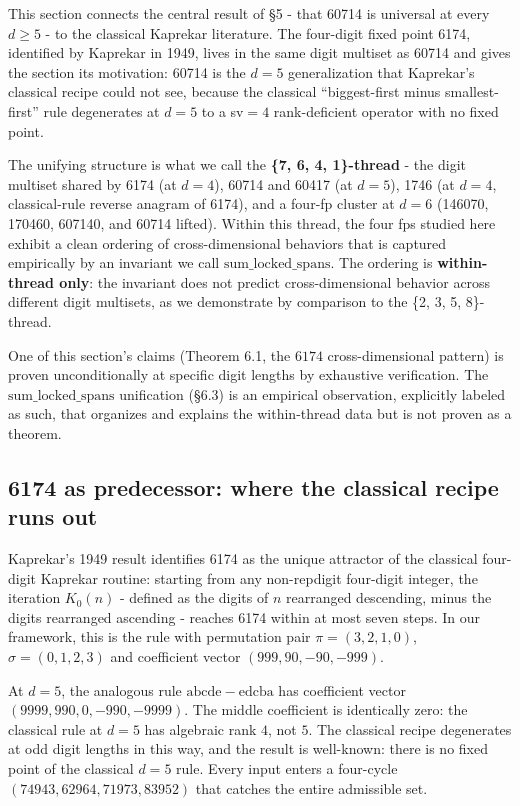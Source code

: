 \documentclass[11pt,letterpaper]{article}
\theoremstyle{paperstyle}
\theoremstyle{paperstyledef}
\theoremstyle{paperstylerem}
\begin{document}
This section connects the central result of §5 - that 60714 is
universal at every \(d \geq 5\) - to the classical Kaprekar
literature. The four-digit fixed point 6174, identified by Kaprekar in
1949, lives in the same digit multiset as 60714 and gives the section
its motivation: 60714 is the \(d = 5\) generalization that Kaprekar's
classical recipe could not see, because the classical ``biggest-first
minus smallest-first'' rule degenerates at \(d = 5\) to a sv\(=4\)
rank-deficient operator with no fixed point.

The unifying structure is what we call the \textbf{\{7, 6, 4,
1\}-thread} - the digit multiset shared by 6174 (at \(d = 4\)), 60714
and 60417 (at \(d = 5\)), 1746 (at \(d = 4\), classical-rule reverse
anagram of 6174), and a four-fp cluster at \(d = 6\) (146070, 170460,
607140, and 60714 lifted). Within this thread, the four fps studied here
exhibit a clean ordering of cross-dimensional behaviors that is captured
empirically by an invariant we call \(\mathrm{sum\_locked\_spans}\). The
ordering is \textbf{within-thread only}: the invariant does not predict
cross-dimensional behavior across different digit multisets, as we
demonstrate by comparison to the \{2, 3, 5, 8\}-thread.

One of this section's claims (Theorem 6.1, the \(6174\)
cross-dimensional pattern) is proven unconditionally at specific digit
lengths by exhaustive verification. The \(\mathrm{sum\_locked\_spans}\)
unification (§6.3) is an empirical observation, explicitly labeled as
such, that organizes and explains the within-thread data but is not
proven as a theorem.

\hypertarget{as-predecessor-where-the-classical-recipe-runs-out}{%
\subsection{6174 as predecessor: where the classical recipe runs out}\label{as-predecessor-where-the-classical-recipe-runs-out}}

Kaprekar's 1949 result identifies 6174 as the unique attractor of the
classical four-digit Kaprekar routine: starting from any non-repdigit
four-digit integer, the iteration \(K_0(n)\) - defined as the digits
of \(n\) rearranged descending, minus the digits rearranged ascending - reaches 6174 within at most seven steps. In our framework, this is
the rule with permutation pair \(\pi = (3, 2, 1, 0)\),
\(\sigma = (0, 1, 2, 3)\) and coefficient vector
\((999, 90, -90, -999)\).

At \(d = 5\), the analogous rule \(\mathrm{abcde} - \mathrm{edcba}\) has
coefficient vector \((9999, 990, 0, -990, -9999)\). The middle
coefficient is identically zero: the classical rule at \(d = 5\) has
algebraic rank \(4\), not \(5\). The classical recipe degenerates at odd
digit lengths in this way, and the result is well-known: there is no
fixed point of the classical \(d = 5\) rule. Every input enters a
four-cycle \((74943, 62964, 71973, 83952)\) that catches the entire
admissible set.
\end{document}
